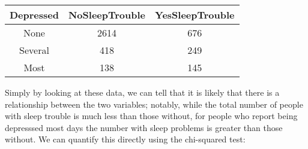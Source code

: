 \documentclass[]{book}
\theoremstyle{definition}
\theoremstyle{definition}
\theoremstyle{definition}
\theoremstyle{remark}
\begin{document}
\begin{longtable}[]{@{}ccc@{}}
\toprule
\begin{minipage}[b]{0.15\columnwidth}\centering\strut
Depressed\strut
\end{minipage} & \begin{minipage}[b]{0.22\columnwidth}\centering\strut
NoSleepTrouble\strut
\end{minipage} & \begin{minipage}[b]{0.22\columnwidth}\centering\strut
YesSleepTrouble\strut
\end{minipage}\tabularnewline
\midrule
\endhead
\begin{minipage}[t]{0.15\columnwidth}\centering\strut
None\strut
\end{minipage} & \begin{minipage}[t]{0.22\columnwidth}\centering\strut
2614\strut
\end{minipage} & \begin{minipage}[t]{0.22\columnwidth}\centering\strut
676\strut
\end{minipage}\tabularnewline
\begin{minipage}[t]{0.15\columnwidth}\centering\strut
Several\strut
\end{minipage} & \begin{minipage}[t]{0.22\columnwidth}\centering\strut
418\strut
\end{minipage} & \begin{minipage}[t]{0.22\columnwidth}\centering\strut
249\strut
\end{minipage}\tabularnewline
\begin{minipage}[t]{0.15\columnwidth}\centering\strut
Most\strut
\end{minipage} & \begin{minipage}[t]{0.22\columnwidth}\centering\strut
138\strut
\end{minipage} & \begin{minipage}[t]{0.22\columnwidth}\centering\strut
145\strut
\end{minipage}\tabularnewline
\bottomrule
\end{longtable}

Simply by looking at these data, we can tell that it is likely that
there is a relationship between the two variables; notably, while the
total number of people with sleep trouble is much less than those
without, for people who report being depresssed most days the number
with sleep problems is greater than those without. We can quantify this
directly using the chi-squared test:
\end{document}
